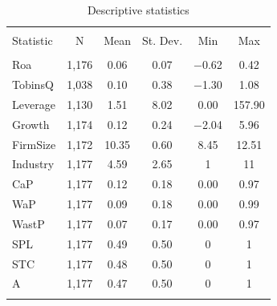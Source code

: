 \documentclass[12pt,]{article}
\begin{document}
\begin{table}[b] \centering 
  \caption{Descriptive statistics} 
  \label{DescriptiveStatistics} 
\begin{tabular}{@{\extracolsep{5pt}}lccccc} 
\\[-1.8ex]\hline 
\hline \\[-1.8ex] 
Statistic & \multicolumn{1}{c}{N} & \multicolumn{1}{c}{Mean} & \multicolumn{1}{c}{St. Dev.} & \multicolumn{1}{c}{Min} & \multicolumn{1}{c}{Max} \\ 
\hline \\[-1.8ex] 
Roa & 1,176 & 0.06 & 0.07 & $-$0.62 & 0.42 \\ 
TobinsQ & 1,038 & 0.10 & 0.38 & $-$1.30 & 1.08 \\ 
Leverage & 1,130 & 1.51 & 8.02 & 0.00 & 157.90 \\ 
Growth & 1,174 & 0.12 & 0.24 & $-$2.04 & 5.96 \\ 
FirmSize & 1,172 & 10.35 & 0.60 & 8.45 & 12.51 \\ 
Industry & 1,177 & 4.59 & 2.65 & 1 & 11 \\ 
CaP & 1,177 & 0.12 & 0.18 & 0.00 & 0.97 \\ 
WaP & 1,177 & 0.09 & 0.18 & 0.00 & 0.99 \\ 
WastP & 1,177 & 0.07 & 0.17 & 0.00 & 0.97 \\ 
SPL & 1,177 & 0.49 & 0.50 & 0 & 1 \\ 
STC & 1,177 & 0.48 & 0.50 & 0 & 1 \\ 
A & 1,177 & 0.47 & 0.50 & 0 & 1 \\ 
\hline \\[-1.8ex] 
\end{tabular} 
\end{table}
\end{document}
